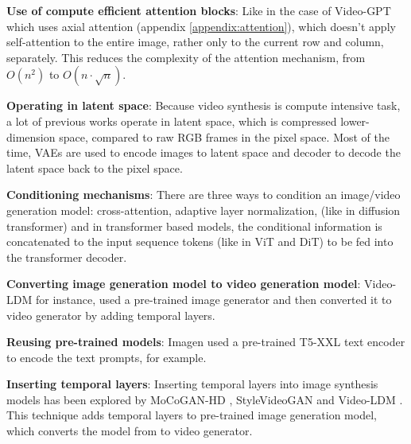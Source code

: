 \textbf{Use of compute efficient attention blocks}: Like in the case of Video-GPT \cite{videogpt} which uses axial attention (appendix \ref{appendix:attention}), which doesn't apply self-attention to the entire image, rather only to the current row and column, separately. This reduces the complexity of the attention mechanism, from $O(n^2)$ to $O(n \cdot \sqrt{n})$.

\textbf{Operating in latent space}: Because video synthesis is compute intensive task, a lot of previous works operate in latent space, which is compressed lower-dimension space, compared to raw RGB frames in the pixel space. Most of the time, VAEs are used to encode images to latent space and decoder to decode the latent space back to the pixel space.

\textbf{Conditioning mechanisms}: There are three ways to condition an image/video generation model: cross-attention, adaptive layer normalization, (like in diffusion transformer) and in transformer based models, the conditional information is concatenated to the input sequence tokens (like in ViT and DiT) to be fed into the transformer decoder.

\textbf{Converting image generation model to video generation model}: Video-LDM \cite{video_ldm} for instance, used a pre-trained image generator and then converted it to video generator by adding temporal layers.

\textbf{Reusing pre-trained models}: Imagen \cite{imagen} used a pre-trained T5-XXL text encoder to encode the text prompts, for example.

\textbf{Inserting temporal layers}: Inserting temporal layers into image synthesis models has been explored by MoCoGAN-HD \cite{mocogan_hd}, StyleVideoGAN \cite{style_video_gan} and Video-LDM \cite{video_ldm}. This technique adds temporal layers to pre-trained image generation model, which converts the model from to video generator.
